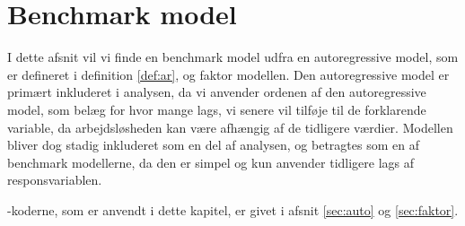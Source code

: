 \chapter{Benchmark model}
I dette afsnit vil vi finde en benchmark model udfra en autoregressive model, som er  defineret i definition \ref{def:ar}, og faktor modellen. 
Den autoregressive model er primært inkluderet i analysen, da vi anvender ordenen af den autoregressive model, som belæg for hvor mange lags, vi senere vil tilføje til de forklarende variable, da arbejdsløsheden kan være afhængig af de tidligere værdier.
Modellen bliver dog stadig inkluderet som en del af analysen, og betragtes som en af benchmark modellerne, da den er simpel og kun anvender tidligere lags af responsvariablen.

\Rlang-koderne, som er anvendt i dette kapitel, er givet i afsnit \ref{sec:auto} og \ref{sec:faktor}.





